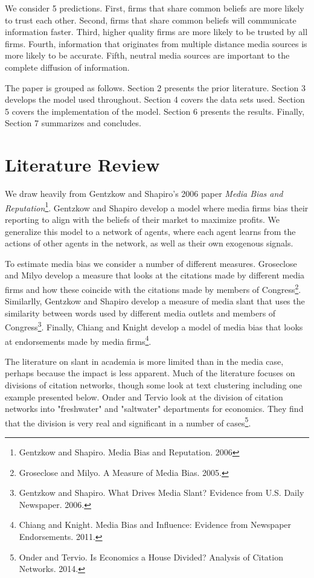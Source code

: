 \documentclass[a4paper]{article}
\begin{document}
We consider 5 predictions.  First, firms that share common beliefs are more likely to trust each other.  Second, firms that share common beliefs will communicate information faster.  Third, higher quality firms are more likely to be trusted by all firms.  Fourth, information that originates from multiple distance media sources is more likely to be accurate.  Fifth, neutral media sources are important to the complete diffusion of information. 

The paper is grouped as follows.  Section 2 presents the prior literature.  Section 3 develops the model used throughout.  Section 4 covers the data sets used.  Section 5 covers the implementation of the model.  Section 6 presents the results.  Finally, Section 7 summarizes and concludes.

\section{Literature Review}

We draw heavily from Gentzkow and Shapiro's 2006 paper \emph{Media Bias and Reputation}\footnote{Gentzkow and Shapiro.  Media Bias and Reputation. 2006}.  Gentzkow and Shapiro develop a model where media firms bias their reporting to align with the beliefs of their market to maximize profits.  We generalize this model to a network of agents, where each agent learns from the actions of other agents in the network, as well as their own exogenous signals.

To estimate media bias we consider a number of different measures.  Groseclose and Milyo develop a measure that looks at the citations made by different media firms and how these coincide with the citations made by members of Congress\footnote{Groseclose and Milyo. A Measure of Media Bias. 2005.}.  Similarlly, Gentzkow and Shapiro develop a measure of media slant that uses the similarity between words used by different media outlets and members of Congress\footnote{Gentzkow and Shapiro.  What Drives Media Slant?  Evidence from U.S. Daily Newspaper. 2006.}.  Finally, Chiang and Knight develop a model of media bias that looks at endorsements made by media firms\footnote{Chiang and Knight.  Media Bias and Influence: Evidence from Newspaper Endorsements. 2011.}.

The literature on slant in academia is more limited than in the media case, perhaps because the impact is less apparent.  Much of the literature focuses on divisions of citation networks, though some look at text clustering including one example presented below.  Onder and Tervio look at the division of citation networks into "freshwater" and "saltwater" departments for economics.  They find that the division is very real and significant in a number of cases\footnote{Onder and Tervio.  Is Economics a House Divided?  Analysis of Citation Networks.  2014.}.
\end{document}
